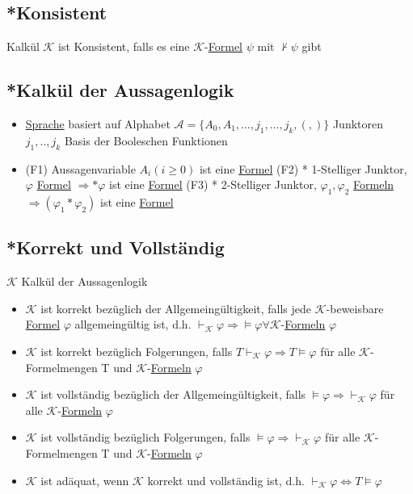 \documentclass[12pt,a4paper]{article} %
\begin{document}
	\subsection{*Konsistent}
	\label{ALKonsistent}
	Kalkül $\mathcal{K}$ ist Konsistent, falls es eine $\mathcal{K}$-\hyperref[Formel]{Formel} $\psi \text{ mit } \nvdash \psi$ gibt
	
	\subsection{*Kalkül der Aussagenlogik}
	\begin{itemize}
		\item \hyperref[ALSprache]{Sprache} basiert auf Alphabet $\mathcal{A} = \{A_0, A_1, ..., j_1, ..., j_k, (, )\}$ Junktoren $j_1, .., j_k$ Basis der Booleschen Funktionen
		\item (F1) Aussagenvariable $A_i (i \ge 0)$ ist eine \hyperref[Formel]{Formel} \newline
		(F2) * 1-Stelliger Junktor, $\varphi$ \hyperref[Formel]{Formel} $\Rightarrow *\varphi$ ist eine \hyperref[Formel]{Formel} \newline
		(F3) * 2-Stelliger Junktor, $\varphi_1, \varphi_2$ \hyperref[Formel]{Formeln} $\Rightarrow (\varphi_1 * \varphi_2)$ ist eine \hyperref[Formel]{Formel}
	\end{itemize}

	\subsection{*Korrekt und Vollständig}
	\label{ALVollstandig}
	$\mathcal{K}$ Kalkül der Aussagenlogik
	\begin{itemize}
		\item $\mathcal{K}$ ist korrekt bezüglich der Allgemeingültigkeit, falls jede $\mathcal{K}$-beweisbare \hyperref[Formel]{Formel} $\varphi$ allgemeingültig ist, d.h. $\hyperref[Beweisbar]{\vdash_{\mathcal{K}}} \varphi \Rightarrow \hyperref[Erfullbar]{\vDash} \varphi \forall \mathcal{K}$-\hyperref[Formel]{Formeln} $\varphi$ 
		\item $\mathcal{K}$ ist korrekt bezüglich Folgerungen, falls $T \hyperref[Beweisbar]{\vdash_{\mathcal{K}}} \varphi \Rightarrow T \hyperref[Erfullbar]{\vDash} \varphi$ für alle $\mathcal{K}$-Formelmengen T und $\mathcal{K}$-\hyperref[Formel]{Formeln} $\varphi$
		\item $\mathcal{K}$ ist vollständig bezüglich der Allgemeingültigkeit, falls $\hyperref[Erfullbar]{\vDash} \varphi \Rightarrow \hyperref[Beweisbar]{\vdash_{\mathcal{K}}} \varphi$ für alle $\mathcal{K}$-\hyperref[Formel]{Formeln} $\varphi$
		\item $\mathcal{K}$ ist vollständig bezüglich Folgerungen, falls $\hyperref[Erfullbar]{\vDash} \varphi \Rightarrow \hyperref[Beweisbar]{\vdash_{\mathcal{K}}} \varphi$ für alle $\mathcal{K}$-Formelmengen T und $\mathcal{K}$-\hyperref[Formel]{Formeln} $\varphi$
		\item $\mathcal{K}$ ist adäquat, wenn $\mathcal{K}$ korrekt und vollständig ist, d.h. $\hyperref[Beweisbar]{\vdash_{\mathcal{K}}} \varphi \Leftrightarrow T \hyperref[Erfullbar]{\vDash} \varphi$
	\end{itemize}
\end{document}
